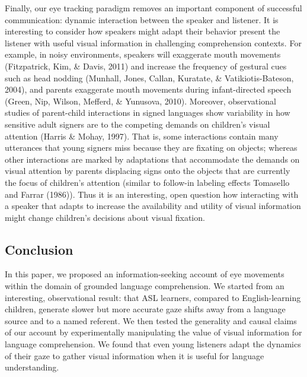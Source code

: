 \documentclass[english,floatsintext,man]{apa6}
\begin{document}
Finally, our eye tracking paradigm removes an important component of
successful communication: dynamic interaction between the speaker and
listener. It is interesting to consider how speakers might adapt their
behavior present the listener with useful visual information in
challenging comprehension contexts. For example, in noisy environments,
speakers will exaggerate mouth movements (Fitzpatrick, Kim, \& Davis,
2011) and increase the frequency of gestural cues such as head nodding
(Munhall, Jones, Callan, Kuratate, \& Vatikiotis-Bateson, 2004), and
parents exaggerate mouth movements during infant-directed speech (Green,
Nip, Wilson, Mefferd, \& Yunusova, 2010). Moreover, observational
studies of parent-child interactions in signed languages show
variability in how sensitive adult signers are to the competing demands
on children's visual attention (Harris \& Mohay, 1997). That is, some
interactions contain many utterances that young signers miss because
they are fixating on objects; whereas other interactions are marked by
adaptations that accommodate the demands on visual attention by parents
displacing signs onto the objects that are currently the focus of
children's attention (similar to follow-in labeling effects Tomasello
and Farrar (1986)). Thus it is an interesting, open question how
interacting with a speaker that adapts to increase the availability and
utility of visual information might change children's decisions about
visual fixation.

\hypertarget{conclusion}{%
\subsection{Conclusion}\label{conclusion}}

In this paper, we proposed an information-seeking account of eye
movements within the domain of grounded language comprehension. We
started from an interesting, observational result: that ASL learners,
compared to English-learning children, generate slower but more accurate
gaze shifts away from a language source and to a named referent. We then
tested the generality and causal claims of our account by experimentally
manipulating the value of visual information for language comprehension.
We found that even young listeners adapt the dynamics of their gaze to
gather visual information when it is useful for language understanding.
\end{document}
